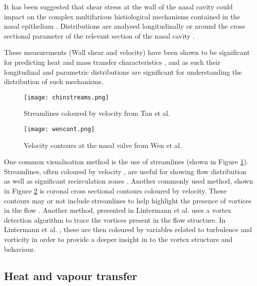 It has been suggested that shear stress at the wall of the nasal cavity could impact on the complex multifarious histiological mechanisms contained in the nasal epithelium \cite{Elad2006}.
Distributions are analysed longitudinally \cite{Wen2008} or around the cross sectional parameter of the relevant section of the nasal cavity \cite{Burgos2014}. 

These measurements (Wall shear and velocity) have been shown to be significant for predicting heat and mass transfer characteristics \cite{Taylor2010}, and as such their longitudinal and parametric distributions are significant for understanding the distribution of such mechanisms. 

\begin{figure}
  \centering
  \texttt{[image: chinstreams.png]}
  \caption{Streamlines coloured by velocity from Tan et al. \cite{Tan2012}} \label{fig:chinstreams}
\centering
\end{figure}

\begin{figure}
  \centering
  \texttt{[image: wencont.png]}
  \caption{Velocity contours at the nasal valve from Wen et al. \cite{Wen2008}} \label{fig:wencont}
\centering
\end{figure}

One common visualisation method is the use of streamlines (shown in Figure \ref{fig:chinstreams}). Streamlines, often coloured by velocity \cite{Wen2008, Zhu2011, Garcia2007}, are useful for showing flow distribution as well as significant recirculation zones \cite{Lintermann2013, Xi2014}. Another commonly used method, shown in Figure \ref{fig:wencont} is coronal cross sectional contours coloured by velocity. These contours may or not include streamlines to help highlight the presence of vortices in the flow \cite{Wen2008}. Another method, presented in Lintermann et al. \cite{Lintermann2013} uses a vortex detection algorithm to trace the vortices present in the flow structure. In Lintermann et al. \cite{Lintermann2013}, these are then coloured by variables related to turbulence and vorticity in order to provide a deeper insight in to the vortex structure and behaviour.

\subsection{Heat and vapour transfer}

